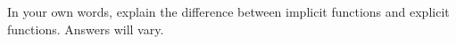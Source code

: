 {In your own words, explain the difference between implicit functions and explicit functions.
}
{Answers will vary.}
